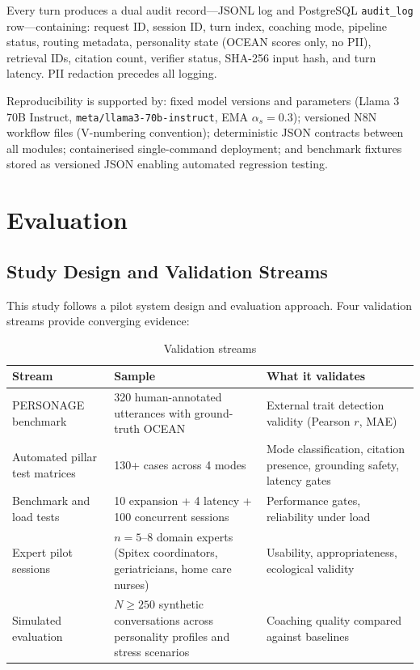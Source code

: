 \documentclass[10pt,a4paper]{report}
\begin{document}
Every turn produces a dual audit record---JSONL log and PostgreSQL \texttt{audit\_log} row---containing: request ID, session ID, turn index, coaching mode, pipeline status, routing metadata, personality state (OCEAN scores only, no PII), retrieval IDs, citation count, verifier status, SHA-256 input hash, and turn latency. PII redaction precedes all logging.

Reproducibility is supported by: fixed model versions and parameters (Llama 3 70B Instruct, \texttt{meta/llama3-70b-instruct}, EMA $\alpha_s = 0.3$); versioned N8N workflow files (V-numbering convention); deterministic JSON contracts between all modules; containerised single-command deployment; and benchmark fixtures stored as versioned JSON enabling automated regression testing.

\chapter{Evaluation}
\label{ch:eval}

\section{Study Design and Validation Streams}

This study follows a pilot system design and evaluation approach. Four validation streams provide converging evidence:

\begin{table}[H]
\centering\small
\caption{Validation streams}
\begin{tabularx}{\textwidth}{@{}lXX@{}}
\toprule
Stream & Sample & What it validates \\
\midrule
PERSONAGE benchmark & 320 human-annotated utterances with ground-truth OCEAN \citep{Mairesse2011} & External trait detection validity (Pearson $r$, MAE) \\
Automated pillar test matrices & 130+ cases across 4 modes & Mode classification, citation presence, grounding safety, latency gates \\
Benchmark and load tests & 10 expansion + 4 latency + 100 concurrent sessions & Performance gates, reliability under load \\
Expert pilot sessions & $n = 5$--8 domain experts (Spitex coordinators, geriatricians, home care nurses) & Usability, appropriateness, ecological validity \\
Simulated evaluation & $N \geq 250$ synthetic conversations across personality profiles and stress scenarios & Coaching quality compared against baselines \\
\bottomrule
\end{tabularx}
\end{table}
\end{document}
